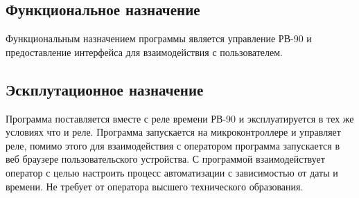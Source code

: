 \subsection{Функциональное назначение}
Функциональным назначением программы является управление РВ-90 и предоставление интерфейса для взаимодействия с пользователем.


\subsection{Эскплутационное назначение}
Программа поставляется вместе с реле времени РВ-90 и эксплуатируется в тех же условиях что и реле. Программа запускается на микроконтроллере и управляет реле, помимо этого для взаимодействия с оператором программа запускается в веб браузере пользовательского устройства. С программой взаимодействует оператор с целью настроить процесс автоматизации с зависимостью от даты и времени. Не требует от оператора высшего технического образования. 